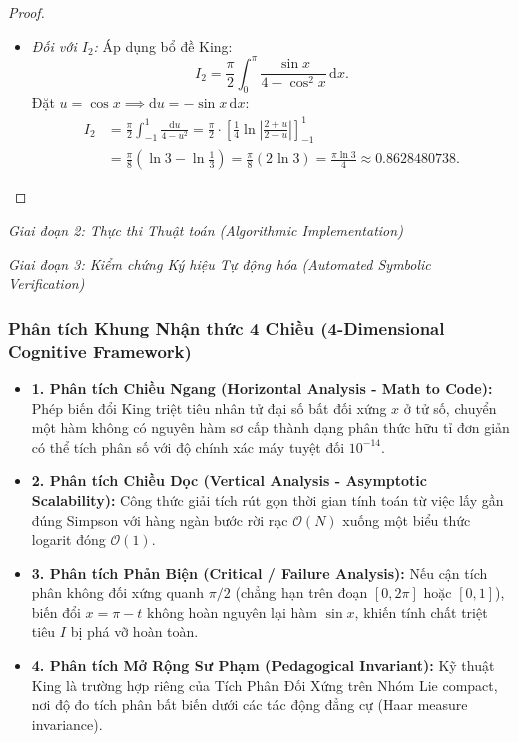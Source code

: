 \documentclass{article}
\begin{document}
\begin{proof}
\begin{itemize}
    \item \emph{Đối với $I_2$:} Áp dụng bổ đề King:
    \begin{equation}
        I_2 = \frac{\pi}{2} \int_0^\pi \frac{\sin x}{4 - \cos^2 x}\,\mathrm{d}x.
    \end{equation}
    Đặt $u = \cos x \implies \mathrm{d}u = -\sin x\,\mathrm{d}x$:
    \begin{align}
        I_2 &= \frac{\pi}{2} \int_{-1}^1 \frac{\mathrm{d}u}{4 - u^2} = \frac{\pi}{2} \cdot \left[ \frac{1}{4} \ln\left|\frac{2 + u}{2 - u}\right| \right]_{-1}^1 \nonumber \\
        &= \frac{\pi}{8} \left( \ln 3 - \ln\frac{1}{3} \right) = \frac{\pi}{8} (2\ln 3) = \frac{\pi \ln 3}{4} \approx 0.8628480738.
    \end{align}
\end{itemize}
\end{proof}

\vspace{0.5em}\noindent\emph{Giai đoạn 2: Thực thi Thuật toán (Algorithmic Implementation)}


\vspace{0.5em}\noindent\emph{Giai đoạn 3: Kiểm chứng Ký hiệu Tự động hóa (Automated Symbolic Verification)}


\subsubsection*{Phân tích Khung Nhận thức 4 Chiều (4-Dimensional Cognitive Framework)}
\begin{itemize}
    \item \textbf{1. Phân tích Chiều Ngang (Horizontal Analysis - Math to Code):} Phép biến đổi King triệt tiêu nhân tử đại số bất đối xứng $x$ ở tử số, chuyển một hàm không có nguyên hàm sơ cấp thành dạng phân thức hữu tỉ đơn giản có thể tích phân số với độ chính xác máy tuyệt đối $10^{-14}$.
    \item \textbf{2. Phân tích Chiều Dọc (Vertical Analysis - Asymptotic Scalability):} Công thức giải tích rút gọn thời gian tính toán từ việc lấy gần đúng Simpson với hàng ngàn bước rời rạc $\mathcal{O}(N)$ xuống một biểu thức logarit đóng $\mathcal{O}(1)$.
    \item \textbf{3. Phân tích Phản Biện (Critical / Failure Analysis):} Nếu cận tích phân không đối xứng quanh $\pi/2$ (chẳng hạn trên đoạn $[0, 2\pi]$ hoặc $[0, 1]$), biến đổi $x = \pi - t$ không hoàn nguyên lại hàm $\sin x$, khiến tính chất triệt tiêu $I$ bị phá vỡ hoàn toàn.
    \item \textbf{4. Phân tích Mở Rộng Sư Phạm (Pedagogical Invariant):} Kỹ thuật King là trường hợp riêng của Tích Phân Đối Xứng trên Nhóm Lie compact, nơi độ đo tích phân bất biến dưới các tác động đẳng cự (Haar measure invariance).
\end{itemize}
\end{document}
